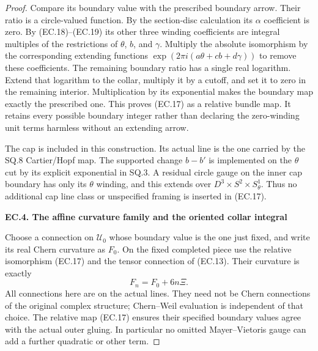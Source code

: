 \begin{proof}
Compare its boundary value with the prescribed boundary arrow.
Their ratio is a circle-valued function. By the section-disc
calculation its \(\alpha\) coefficient is zero. By (EC.18)--(EC.19)
its other three winding coefficients are integral multiples
of the restrictions of \(\theta\), \(b\), and \(\gamma\). Multiply the
absolute isomorphism by the corresponding extending functions
\(\exp(2\pi i(a\theta+cb+d\gamma))\) to remove these coefficients.
The remaining boundary ratio has a single real logarithm.
Extend that logarithm to the collar, multiply it by a cutoff,
and set it to zero in the remaining interior. Multiplication
by its exponential makes the boundary map exactly the
prescribed one. This proves (EC.17) as a relative bundle map.
It retains every possible boundary integer rather than declaring
the zero-winding unit terms harmless without an extending arrow.

The cap is included in this construction. Its actual line is
the one carried by the SQ.8 Cartier/Hopf map. The supported
change \(b-b'\) is implemented on the \(\theta\) cut by its explicit
exponential in SQ.3. A residual circle gauge on the inner cap
boundary has only its \(\theta\) winding, and this extends over
\(D^3\times S^2\times S^1_\theta\). Thus no additional cap
line class or unspecified framing is inserted in (EC.17).

\par

\medskip\noindent\textbf{EC.4. The affine curvature family and the oriented collar integral}

\par\nobreak

Choose a connection on \(\mathcal U_0\) whose boundary value is
the one just fixed, and write its real Chern curvature as \(F_0\).
On the fixed completed piece use the relative isomorphism
(EC.17) and the tensor connection of (EC.13). Their curvature is
exactly
\[
                         F_n=F_0+6n\Xi .
                                                        \tag{EC.22}
\]
All connections here are on the actual lines. They need not be
Chern connections of the original complex structure; Chern--Weil
evaluation is independent of that choice. The relative map
(EC.17) ensures their specified boundary values agree with
the actual outer gluing. In particular no omitted Mayer--Vietoris
gauge can add a further quadratic or other term.


\end{proof}
